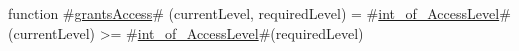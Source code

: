 function #\hyperref[sailMIPSzgrantsAccess]{grantsAccess}# (currentLevel, requiredLevel) =
  #\hyperref[sailMIPSzintzyofzyAccessLevel]{int\_of\_AccessLevel}#(currentLevel) >= #\hyperref[sailMIPSzintzyofzyAccessLevel]{int\_of\_AccessLevel}#(requiredLevel)
